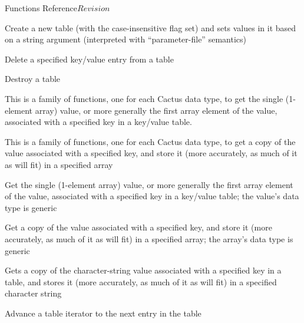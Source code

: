 \begin{cactuspart}{ Functions Reference}{}{$Revision$}
\begin{Lentry}
\item[\code{Util\_TableCreateFromString}]
     [\pageref{Util-TableCreateFromString}]
Create a new table (with the case-insensitive flag set) and sets
values in it based on a string argument (interpreted with
``parameter-file'' semantics)

\item[\code{Util\_TableDeleteKey}]
     [\pageref{Util-TableDeleteKey}]
Delete a specified key/value entry from a table

\item[\code{Util\_TableDestroy}]
     [\pageref{Util-TableDestroy}]
Destroy a table

\item[\code{Util\_TableGet*}]
     [\pageref{Util-TableGet*}]
This is a family of functions, one for each Cactus data type,
to get the single (1-element array) value, or more generally the
first array element of the value, associated with a specified key
in a key/value table.

\item[\code{Util\_TableGet*Array}]
     [\pageref{Util-TableGet*Array}]
This is a family of functions, one for each Cactus data type,
to get a copy of the value associated with a specified key, and store
it (more accurately, as much of it as will fit) in a specified array

\item[\code{Util\_TableGetGeneric}]
     [\pageref{Util-TableGetGeneric}]
Get the single (1-element array) value, or more generally the
first array element of the value, associated with a specified key
in a key/value table; the value's data type is generic

\item[\code{Util\_TableGetGenericArray}]
     [\pageref{Util-TableGetGenericArray}]
Get a copy of the value associated with a specified key, and store
it (more accurately, as much of it as will fit) in a specified array;
the array's data type is generic

\item[\code{Util\_TableGetString}]
     [\pageref{Util-TableGetString}]
Gets a copy of the character-string value associated with a specified
key in a table, and stores it (more accurately, as much of it as will fit)
in a specified character string

\item[\code{Util\_TableItAdvance}]
     [\pageref{Util-TableItAdvance}]
Advance a table iterator to the next entry in the table


\end{Lentry}
\end{cactuspart}
